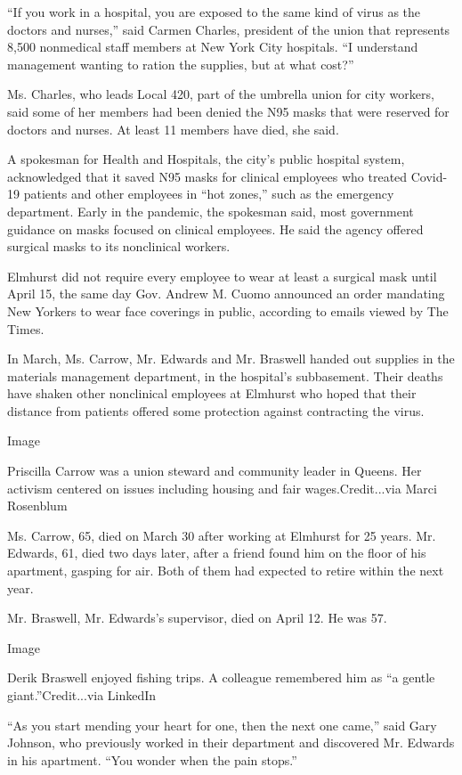 ``If you work in a hospital, you are exposed to the same kind of virus
as the doctors and nurses,'' said Carmen Charles, president of the union
that represents 8,500 nonmedical staff members at New York City
hospitals. ``I understand management wanting to ration the supplies, but
at what cost?''

Ms. Charles, who leads Local 420, part of the umbrella union for city
workers, said some of her members had been denied the N95 masks that
were reserved for doctors and nurses. At least 11 members have died, she
said.

A spokesman for Health and Hospitals, the city's public hospital system,
acknowledged that it saved N95 masks for clinical employees who treated
Covid-19 patients and other employees in ``hot zones,'' such as the
emergency department. Early in the pandemic, the spokesman said, most
government guidance on masks focused on clinical employees. He said the
agency offered surgical masks to its nonclinical workers.

Elmhurst did not require every employee to wear at least a surgical mask
until April 15, the same day Gov. Andrew M. Cuomo announced an order
mandating New Yorkers to wear face coverings in public, according to
emails viewed by The Times.

In March, Ms. Carrow, Mr. Edwards and Mr. Braswell handed out supplies
in the materials management department, in the hospital's subbasement.
Their deaths have shaken other nonclinical employees at Elmhurst who
hoped that their distance from patients offered some protection against
contracting the virus.

Image

Priscilla Carrow was a union steward and community leader in Queens. Her
activism centered on issues including housing and fair
wages.Credit...via Marci Rosenblum

Ms. Carrow, 65, died on March 30 after working at Elmhurst for 25 years.
Mr. Edwards, 61, died two days later, after a friend found him on the
floor of his apartment, gasping for air. Both of them had expected to
retire within the next year.

Mr. Braswell, Mr. Edwards's supervisor, died on April 12. He was 57.

Image

Derik Braswell enjoyed fishing trips. A colleague remembered him as ``a
gentle giant.''Credit...via LinkedIn

``As you start mending your heart for one, then the next one came,''
said Gary Johnson, who previously worked in their department and
discovered Mr. Edwards in his apartment. ``You wonder when the pain
stops.''

